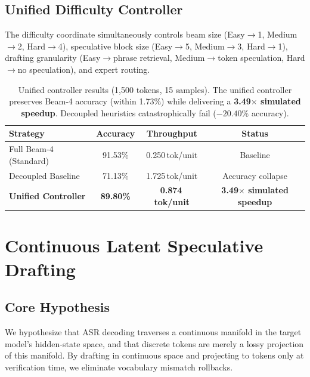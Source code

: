 \documentclass[11pt,a4paper]{article}
\begin{document}
\subsection{Unified Difficulty Controller}

The difficulty coordinate simultaneously controls beam size (Easy$\to$1, Medium$\to$2, Hard$\to$4), speculative block size (Easy$\to$5, Medium$\to$3, Hard$\to$1), drafting granularity (Easy$\to$phrase retrieval, Medium$\to$token speculation, Hard$\to$no speculation), and expert routing.

\begin{table}[H]
\centering
\small
\begin{tabular}{@{}lccc@{}}
\toprule
\textbf{Strategy} & \textbf{Accuracy} & \textbf{Throughput} & \textbf{Status} \\
\midrule
Full Beam-4 (Standard) & 91.53\% & 0.250\,tok/unit & Baseline \\
Decoupled Baseline & 71.13\% & 1.725\,tok/unit & \textcolor{failure}{Accuracy collapse} \\
\textbf{Unified Controller} & \textbf{89.80\%} & \textbf{0.874\,tok/unit} & \textcolor{success}{\textbf{3.49$\times$ simulated speedup}} \\
\bottomrule
\end{tabular}
\caption{Unified controller results (1,500 tokens, 15 samples).
The unified controller preserves Beam-4 accuracy (within 1.73\%) while delivering a \textbf{3.49$\times$ simulated speedup}.
Decoupled heuristics catastrophically fail ($-20.40\%$ accuracy).}
\label{tab:unified}
\end{table}


\section{Continuous Latent Speculative Drafting}

\subsection{Core Hypothesis}
We hypothesize that ASR decoding traverses a continuous manifold in the target model's hidden-state space, and that discrete tokens are merely a lossy projection of this manifold.
By drafting in continuous space and projecting to tokens only at verification time, we eliminate vocabulary mismatch rollbacks.
\end{document}
